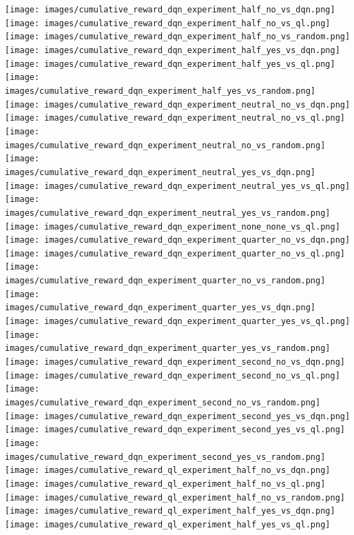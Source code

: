 \texttt{[image: images/cumulative\_reward\_dqn\_experiment\_half\_no\_vs\_dqn.png]} 
\texttt{[image: images/cumulative\_reward\_dqn\_experiment\_half\_no\_vs\_ql.png]} 
\texttt{[image: images/cumulative\_reward\_dqn\_experiment\_half\_no\_vs\_random.png]} 
\texttt{[image: images/cumulative\_reward\_dqn\_experiment\_half\_yes\_vs\_dqn.png]} 
\texttt{[image: images/cumulative\_reward\_dqn\_experiment\_half\_yes\_vs\_ql.png]} 
\texttt{[image: images/cumulative\_reward\_dqn\_experiment\_half\_yes\_vs\_random.png]} 
\texttt{[image: images/cumulative\_reward\_dqn\_experiment\_neutral\_no\_vs\_dqn.png]} 
\texttt{[image: images/cumulative\_reward\_dqn\_experiment\_neutral\_no\_vs\_ql.png]} 
\texttt{[image: images/cumulative\_reward\_dqn\_experiment\_neutral\_no\_vs\_random.png]} 
\texttt{[image: images/cumulative\_reward\_dqn\_experiment\_neutral\_yes\_vs\_dqn.png]} 
\texttt{[image: images/cumulative\_reward\_dqn\_experiment\_neutral\_yes\_vs\_ql.png]} 
\texttt{[image: images/cumulative\_reward\_dqn\_experiment\_neutral\_yes\_vs\_random.png]} 
\texttt{[image: images/cumulative\_reward\_dqn\_experiment\_none\_none\_vs\_ql.png]} 
\texttt{[image: images/cumulative\_reward\_dqn\_experiment\_quarter\_no\_vs\_dqn.png]} 
\texttt{[image: images/cumulative\_reward\_dqn\_experiment\_quarter\_no\_vs\_ql.png]} 
\texttt{[image: images/cumulative\_reward\_dqn\_experiment\_quarter\_no\_vs\_random.png]} 
\texttt{[image: images/cumulative\_reward\_dqn\_experiment\_quarter\_yes\_vs\_dqn.png]} 
\texttt{[image: images/cumulative\_reward\_dqn\_experiment\_quarter\_yes\_vs\_ql.png]} 
\texttt{[image: images/cumulative\_reward\_dqn\_experiment\_quarter\_yes\_vs\_random.png]} 
\texttt{[image: images/cumulative\_reward\_dqn\_experiment\_second\_no\_vs\_dqn.png]} 
\texttt{[image: images/cumulative\_reward\_dqn\_experiment\_second\_no\_vs\_ql.png]} 
\texttt{[image: images/cumulative\_reward\_dqn\_experiment\_second\_no\_vs\_random.png]} 
\texttt{[image: images/cumulative\_reward\_dqn\_experiment\_second\_yes\_vs\_dqn.png]} 
\texttt{[image: images/cumulative\_reward\_dqn\_experiment\_second\_yes\_vs\_ql.png]} 
\texttt{[image: images/cumulative\_reward\_dqn\_experiment\_second\_yes\_vs\_random.png]} 
\texttt{[image: images/cumulative\_reward\_ql\_experiment\_half\_no\_vs\_dqn.png]} 
\texttt{[image: images/cumulative\_reward\_ql\_experiment\_half\_no\_vs\_ql.png]} 
\texttt{[image: images/cumulative\_reward\_ql\_experiment\_half\_no\_vs\_random.png]} 
\texttt{[image: images/cumulative\_reward\_ql\_experiment\_half\_yes\_vs\_dqn.png]} 
\texttt{[image: images/cumulative\_reward\_ql\_experiment\_half\_yes\_vs\_ql.png]} 
